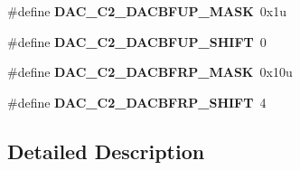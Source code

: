 \begin{DoxyCompactItemize}
\item 
\hypertarget{group___d_a_c___register___masks_ga329015367026aaee34f54edcbaab61bb}{}\#define {\bfseries D\+A\+C\+\_\+\+C2\+\_\+\+D\+A\+C\+B\+F\+U\+P\+\_\+\+M\+A\+S\+K}~0x1u\label{group___d_a_c___register___masks_ga329015367026aaee34f54edcbaab61bb}

\item 
\hypertarget{group___d_a_c___register___masks_ga5d43a79719748e490a572fa6cdc75efe}{}\#define {\bfseries D\+A\+C\+\_\+\+C2\+\_\+\+D\+A\+C\+B\+F\+U\+P\+\_\+\+S\+H\+I\+F\+T}~0\label{group___d_a_c___register___masks_ga5d43a79719748e490a572fa6cdc75efe}

\item 
\hypertarget{group___d_a_c___register___masks_ga64b53e5effabf2e736fca6088752e6ea}{}\#define {\bfseries D\+A\+C\+\_\+\+C2\+\_\+\+D\+A\+C\+B\+F\+R\+P\+\_\+\+M\+A\+S\+K}~0x10u\label{group___d_a_c___register___masks_ga64b53e5effabf2e736fca6088752e6ea}

\item 
\hypertarget{group___d_a_c___register___masks_ga0ab880f693c25ecf491d3b76df611456}{}\#define {\bfseries D\+A\+C\+\_\+\+C2\+\_\+\+D\+A\+C\+B\+F\+R\+P\+\_\+\+S\+H\+I\+F\+T}~4\label{group___d_a_c___register___masks_ga0ab880f693c25ecf491d3b76df611456}

\end{DoxyCompactItemize}


\subsection{Detailed Description}
